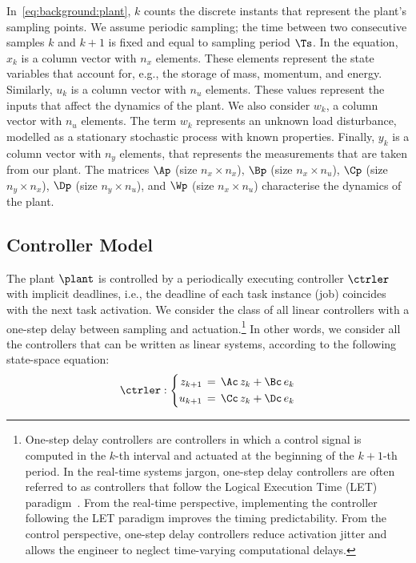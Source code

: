 In~\eqref{eq:background:plant}, $k$ counts the discrete instants that represent the plant's sampling points.
We assume periodic sampling; the time between two consecutive samples $k$ and $k+1$ is fixed and equal to sampling period $\Ts$.
In the equation, $x_k$ is a column vector with $n_x$ elements.
These elements represent the state variables that account for, e.g., the storage of mass, momentum, and energy.
Similarly, $u_k$ is a column vector with $n_u$ elements.
These values represent the inputs that affect the dynamics of the plant.
We also consider $w_k$, a column vector with $n_u$ elements.
The term $w_k$ represents an unknown load disturbance, modelled as a stationary stochastic process with known properties.
Finally, $y_k$ is a column vector with $n_y$ elements, that represents the measurements that are taken from our plant.
The matrices $\Ap$ (size $n_x \times n_x$), $\Bp$ (size $n_x \times n_u$), $\Cp$ (size $n_y \times n_x$), $\Dp$ (size $n_y \times n_u$), and $\Wp$ (size $n_x \times n_u$) characterise the dynamics of the plant.

\subsection{Controller Model}

The plant $\plant$ is controlled by a periodically executing controller $\ctrler$ with implicit deadlines, i.e., the deadline of each task instance (job) coincides with the next task activation.
We consider the class of all linear controllers with a one-step delay between sampling and actuation.\footnote{One-step delay controllers are controllers in which a control signal is computed in the $k$-th interval and actuated at the beginning of the $k+1$-th period. In the real-time systems jargon, one-step delay controllers are often referred to as controllers that follow the Logical Execution Time (LET) paradigm~\cite{Kirsch:2012, Ernst:2018}. From the real-time perspective, implementing the controller following the LET paradigm improves the timing predictability. From the control perspective, one-step delay controllers reduce activation jitter and allows the engineer to neglect time-varying computational delays.}
In other words, we consider all the controllers that can be written as linear systems, according to the following state-space equation:
\begin{equation}
\label{eq:background:controller}
    \ctrler : \left\{
    \begin{aligned}
        z_{k+1} &\,=\, \Ac\,z_k + \Bc\,e_k \\
        u_{k+1} &\,=\, \Cc\,z_k + \Dc\,e_k
    \end{aligned}
    \right.
\end{equation}

